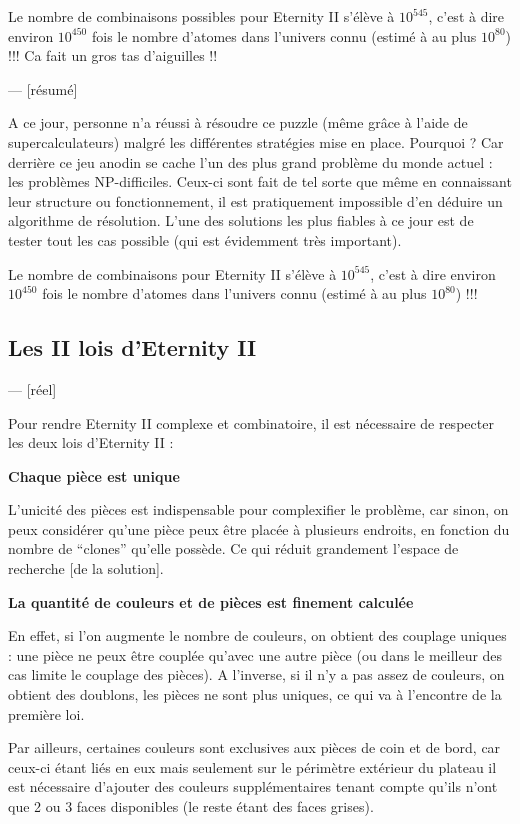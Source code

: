 	\begin{exmp}
		Le nombre de combinaisons possibles pour Eternity II s'élève à $10^{545}$, c'est à dire environ $10^{450}$ fois le nombre d'atomes dans l'univers connu (estimé à au plus $10^{80}$) !!! Ca fait un gros tas d'aiguilles !!
	\end{exmp}
		
	--- [résumé]
	
	A ce jour, personne n'a réussi à résoudre ce puzzle (même grâce à l'aide de supercalculateurs) malgré les différentes stratégies mise en place. Pourquoi ? Car derrière ce jeu anodin se cache l'un des plus grand problème du monde actuel : les problèmes NP-difficiles. Ceux-ci sont fait de tel sorte que même en connaissant leur structure ou fonctionnement, il est pratiquement impossible d'en déduire un algorithme de résolution. L'une des solutions les plus fiables à ce jour est de tester tout les cas possible (qui est évidemment très important).
	
	\begin{exmp}
		Le nombre de combinaisons pour Eternity II s'élève à $10^{545}$, c'est à dire environ $10^{450}$ fois le nombre d'atomes dans l'univers connu (estimé à au plus $10^{80}$) !!!
	\end{exmp}
	
	\subsection{Les II lois d'Eternity II}
	
	--- [réel]
	
	Pour rendre Eternity II complexe et combinatoire, il est nécessaire de respecter les deux lois d'Eternity II :
	
	\begin{law}
		\textbf{Chaque pièce est unique}
		
		L'unicité des pièces est indispensable pour complexifier le problème, car sinon, on peux considérer qu'une pièce peux être placée à plusieurs endroits, en fonction du nombre de \enquote{clones} qu'elle possède. Ce qui réduit grandement l'espace de recherche [de la solution].
	\end{law}

	\begin{law}
		\textbf{La quantité de couleurs et de pièces est finement calculée}
		
		En effet, si l'on augmente le nombre de couleurs, on obtient des couplage uniques : une pièce ne peux être couplée qu'avec une autre pièce (ou dans le meilleur des cas limite le couplage des pièces). A l'inverse, si il n'y a pas assez de couleurs, on obtient des doublons, les pièces ne sont plus uniques, ce qui va à l'encontre de la première loi.
		
		Par ailleurs, certaines couleurs sont exclusives aux pièces de coin et de bord, car ceux-ci étant liés en eux mais seulement sur le périmètre extérieur du plateau il est nécessaire d'ajouter des couleurs supplémentaires tenant compte qu'ils n'ont que 2 ou 3 faces disponibles (le reste étant des faces grises).
	\end{law}
	

